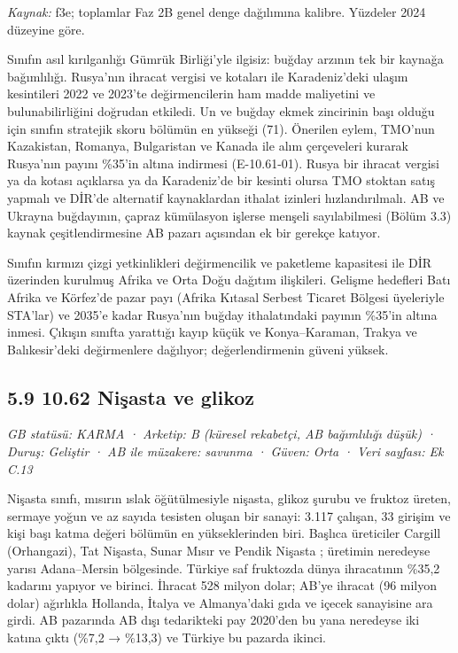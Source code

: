 \emph{Kaynak:} \etiketT{} f3e; toplamlar Faz 2B genel denge dağılımına kalibre. Yüzdeler 2024 düzeyine göre.

Sınıfın asıl kırılganlığı Gümrük Birliği'yle ilgisiz: buğday arzının tek bir kaynağa bağımlılığı. Rusya'nın ihracat vergisi ve kotaları ile Karadeniz'deki ulaşım kesintileri 2022 ve 2023'te değirmencilerin ham madde maliyetini ve bulunabilirliğini doğrudan etkiledi. Un ve buğday ekmek zincirinin başı olduğu için sınıfın stratejik skoru bölümün en yükseği (71). Önerilen eylem, TMO'nun Kazakistan, Romanya, Bulgaristan ve Kanada ile alım çerçeveleri kurarak Rusya'nın payını \%35'in altına indirmesi (E-10.61-01). Rusya bir ihracat vergisi ya da kotası açıklarsa ya da Karadeniz'de bir kesinti olursa TMO stoktan satış yapmalı ve DİR'de alternatif kaynaklardan ithalat izinleri hızlandırılmalı. AB ve Ukrayna buğdayının, çapraz kümülasyon işlerse menşeli sayılabilmesi (Bölüm 3.3) kaynak çeşitlendirmesine AB pazarı açısından ek bir gerekçe katıyor.

Sınıfın kırmızı çizgi yetkinlikleri değirmencilik ve paketleme kapasitesi ile DİR üzerinden kurulmuş Afrika ve Orta Doğu dağıtım ilişkileri. Gelişme hedefleri Batı Afrika ve Körfez'de pazar payı (Afrika Kıtasal Serbest Ticaret Bölgesi üyeleriyle STA'lar) ve 2035'e kadar Rusya'nın buğday ithalatındaki payının \%35'in altına inmesi. Çıkışın sınıfta yarattığı kayıp küçük ve Konya--Karaman, Trakya ve Balıkesir'deki değirmenlere dağılıyor; değerlendirmenin güveni yüksek.

\hypertarget{nace_kartlar_10-12-59-1062-niux15fasta-ve-glikoz}{%
\subsection{5.9 10.62 Nişasta ve glikoz}\label{nace_kartlar_10-12-59-1062-niux15fasta-ve-glikoz}}

\emph{GB statüsü: KARMA · Arketip: B (küresel rekabetçi, AB bağımlılığı düşük) · Duruş: Geliştir · AB ile müzakere: savunma · Güven: Orta · Veri sayfası: Ek C.13}

Nişasta sınıfı, mısırın ıslak öğütülmesiyle nişasta, glikoz şurubu ve fruktoz üreten, sermaye yoğun ve az sayıda tesisten oluşan bir sanayi: 3.117 çalışan, 33 girişim ve kişi başı katma değeri bölümün en yükseklerinden biri. Başlıca üreticiler Cargill (Orhangazi), Tat Nişasta, Sunar Mısır ve Pendik Nişasta \etiketH{}; üretimin neredeyse yarısı Adana--Mersin bölgesinde. Türkiye saf fruktozda dünya ihracatının \%35,2 kadarını yapıyor ve birinci. İhracat 528 milyon dolar; AB'ye ihracat (96 milyon dolar) ağırlıkla Hollanda, İtalya ve Almanya'daki gıda ve içecek sanayisine ara girdi. AB pazarında AB dışı tedarikteki pay 2020'den bu yana neredeyse iki katına çıktı (\%7,2 → \%13,3) ve Türkiye bu pazarda ikinci.

